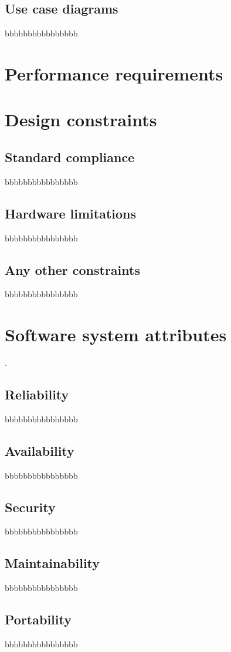 \subsection{Use case diagrams}
\label{subsec:use case diagrams}%
bbbbbbbbbbbbbbbb

\section{Performance requirements}
\label{sec:performance requirements}%

\section{Design constraints}
\label{sec:design constraints}%

\subsection{Standard compliance}
\label{subsec:standard compliance}%
bbbbbbbbbbbbbbbb

\subsection{Hardware limitations}
\label{subsec:hardware limitations}%
bbbbbbbbbbbbbbbb

\subsection{Any other constraints}
\label{subsec:software interfaces}%
bbbbbbbbbbbbbbbb

\section{Software system attributes}
\label{sec:software system attributes}%
.
\subsection{Reliability}
\label{subsec:reliability}%
bbbbbbbbbbbbbbbb

\subsection{Availability}
\label{subsec:availability}%
bbbbbbbbbbbbbbbb

\subsection{Security}
\label{subsec:security}%
bbbbbbbbbbbbbbbb

\subsection{Maintainability}
\label{subsec:maintainability}%
bbbbbbbbbbbbbbbb

\subsection{Portability}
\label{subsec:portability}%
bbbbbbbbbbbbbbbb



